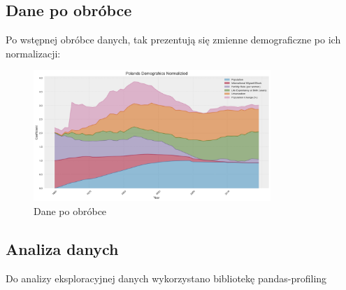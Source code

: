 \documentclass[11pt]{article}
\begin{document}
\subsection{Dane po obróbce}
Po wstępnej obróbce danych, tak prezentują się zmienne demograficzne po ich normalizacji:
\begin{figure}[H]
        \centering
        \includegraphics[width=0.8\textwidth]{images/normalized_all_vars.png}
        \caption{Dane po obróbce}
\end{figure}
\subsection{Analiza danych}
Do analizy eksploracyjnej danych wykorzystano bibliotekę pandas-profiling\cite{pp}
\end{document}
